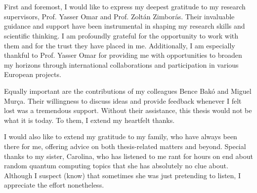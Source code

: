 
\section*{\acknowledgments}\label{sec:acknowledgments}



First and foremost, I would like to express my deepest gratitude to my research supervisors, Prof. Yasser Omar and Prof. Zoltán Zimborás. Their invaluable guidance and support have been instrumental in shaping my research skills and scientific thinking. I am profoundly grateful for the opportunity to work with them and for the trust they have placed in me. Additionally, I am especially thankful to Prof. Yasser Omar for providing me with opportunities to broaden my horizons through international collaborations and participation in various European projects.

Equally important are the contributions of my colleagues Bence Bakó and Miguel Murça. Their willingness to discuss ideas and provide feedback whenever I felt lost was a tremendous support. Without their assistance, this thesis would not be what it is today. To them, I extend my heartfelt thanks.

I would also like to extend my gratitude to my family, who have always been there for me, offering advice on both thesis-related matters and beyond.  Special thanks to my sister, Carolina, who has listened to me rant for hours on end about random quantum computing topics that she has absolutely no clue about. Although I suspect (know) that sometimes she was just pretending to listen, I appreciate the effort nonetheless.

